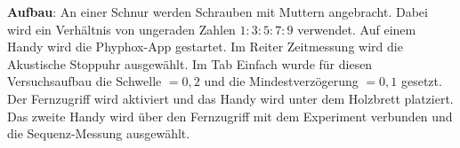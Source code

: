 \documentclass[../main.tex]{subfiles}
\begin{document}
\begin{tcolorbox}
\begin{minipage}[]{0.75\textwidth}
        \vspace{0.4cm}
        \textbf{Aufbau}: An einer Schnur werden Schrauben mit Muttern angebracht. Dabei wird ein Verhältnis von ungeraden Zahlen $1:3:5:7:9$ verwendet. Auf einem Handy wird die Phyphox-App gestartet. Im Reiter \glqq Zeitmessung\grqq{} wird die \glqq Akustische Stoppuhr\grqq{} ausgewählt. Im Tab \glqq Einfach\grqq{} wurde für diesen Versuchsaufbau die Schwelle $=0,2$ und die Mindestverzögerung $=0,1$ gesetzt. Der Fernzugriff wird aktiviert und das Handy wird unter dem Holzbrett platziert. Das zweite Handy wird über den Fernzugriff mit dem Experiment verbunden und die \glqq Sequenz\grqq{}-Messung ausgewählt.
    \end{minipage}
    \hspace{0.3cm}
    \begin{minipage}[]{0.2\textwidth}

\end{minipage}
\end{tcolorbox}
\end{document}
